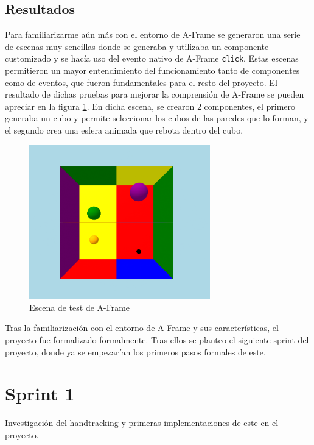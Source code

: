 \documentclass[a4paper, 12pt]{book}
\begin{document}
\subsection{Resultados}
\label{subsec:resultados0}
Para familiarizarme aún más con el entorno de A-Frame se generaron una serie de escenas muy sencillas donde se generaba y utilizaba un componente customizado y se hacía uso del evento nativo de A-Frame \texttt{click}. Estas escenas permitieron un mayor entendimiento del funcionamiento tanto de componentes como de eventos, que fueron fundamentales para el resto del proyecto.
El resultado de dichas pruebas para mejorar la comprensión de A-Frame se pueden apreciar en la figura \ref{fig:sprint0}. En dicha escena, se crearon 2 componentes, el primero generaba un cubo y permite seleccionar los cubos de las paredes que lo forman, y el segundo crea una esfera animada que rebota dentro del cubo. 
\begin{figure}[H] 
  \centering
  \includegraphics[width=0.7\textwidth]{img/primera_escena.png} 
  \caption{Escena de test de A-Frame}
  \label{fig:sprint0}
\end{figure}

Tras la familiarización con el entorno de A-Frame y sus características, el proyecto fue formalizado formalmente. Tras ellos se planteo el siguiente sprint del proyecto, donde ya se empezarían los primeros pasos formales de este. 

\section{Sprint 1}
\label{sec:sprint1}
Investigación del handtracking y primeras implementaciones de este en el proyecto.
\end{document}
